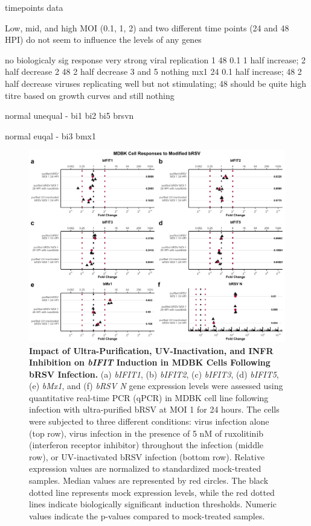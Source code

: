 timepoints data

Low, mid, and high MOI (0.1, 1, 2) and two different time points (24 and 48 HPI) do not seem to influence the levels of any genes

no biologicaly sig response
very strong viral replication
1 48 0.1 1 half increase; 2 half decrease
2 48 2 half decrease
3 and 5 nothing
mx1 24 0.1 half increase; 48 2 half decrease
viruses replicating well but not stimulating; 48 should be quite high titre based on growth curves and still nothing


normal unequal - bi1 bi2  bi5 brsvn

normal euqal - bi3 bmx1

\begin{figure}
    \centering
    \includegraphics[width=1\linewidth]{07. Chapter 2/Figs/02. Induction/04. mdbk_brsv_uv_roxo.pdf}
    \caption[Impact of Ultra-Purification, UV-Inactivation, and INFR Inhibition on \textit{bIFIT} Induction in MDBK Cells Following bRSV Infection.]{\textbf{Impact of Ultra-Purification, UV-Inactivation, and INFR Inhibition on \textit{bIFIT} Induction in MDBK Cells Following bRSV Infection.} (a) \textit{bIFIT1}, (b) \textit{bIFIT2}, (c) \textit{bIFIT3}, (d) \textit{bIFIT5}, (e) \textit{bMx1}, and (f) \textit{bRSV N} gene expression levels were assessed using quantitative real-time PCR (qPCR) in MDBK cell line following infection with ultra-purified bRSV at MOI 1 for 24 hours. The cells were subjected to three different conditions: virus infection alone (top row), virus infection in the presence of 5 nM of ruxolitinib (interferon receptor inhibitor) throughout the infection (middle row), or UV-inactivated bRSV infection (bottom row). Relative expression values are normalized to standardized mock-treated samples. Median values are represented by red circles. The black dotted line represents mock expression levels, while the red dotted lines indicate biologically significant induction thresholds. Numeric values indicate the p-values compared to mock-treated samples.}
    \label{fig:The effect of ultra-purification, UV-inactivation and INFR inhibition on hIFIT induction following hRSV infection in MDBK}
\end{figure}


